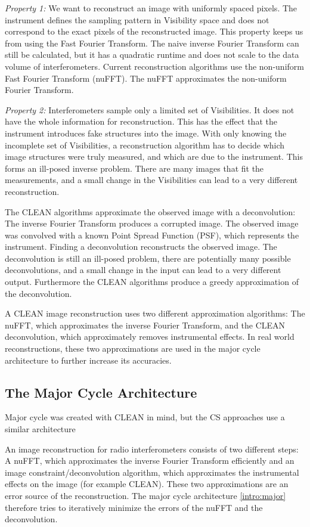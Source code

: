 \textit{Property 1:} We want to reconstruct an image with uniformly spaced pixels. The instrument defines the sampling pattern in Visibility space and does not correspond to the exact pixels of the reconstructed image. This property keeps us from using the Fast Fourier Transform. The naive inverse Fourier Transform can still be calculated, but it has a quadratic runtime and does not scale to the data volume of interferometers. Current reconstruction algorithms use the non-uniform Fast Fourier Transform (nuFFT). The nuFFT approximates the non-uniform Fourier Transform. 

\textit{Property 2:} Interferometers sample only a limited set of Visibilities. It does not have the whole information for reconstruction. This has the effect that the instrument introduces fake structures into the image. With only knowing the incomplete set of Visibilities, a reconstruction algorithm has to decide which image structures were truly measured, and which are due to the instrument. This forms an ill-posed inverse problem. There are many images that fit the measurements, and a small change in the Visibilities can lead to a very different reconstruction. 

The CLEAN algorithms approximate the observed image with a deconvolution: The inverse Fourier Transform produces a corrupted image. The observed image was convolved with a known Point Spread Function (PSF), which represents the instrument. Finding a deconvolution reconstructs the observed image. The deconvolution is still an ill-posed problem, there are potentially many possible deconvolutions, and a small change in the input can lead to a very different output. Furthermore the CLEAN algorithms produce a greedy approximation of the deconvolution. 

A CLEAN image reconstruction uses two different approximation algorithms: The nuFFT, which approximates the inverse Fourier Transform, and the CLEAN deconvolution, which approximately removes instrumental effects. In real world reconstructions, these two approximations are used in the major cycle architecture to further increase its accuracies.

\subsection{The Major Cycle Architecture}
Major cycle was created with CLEAN in mind, but the CS approaches use a similar architecture

An image reconstruction for radio interferometers consists of two different steps: A nuFFT, which approximates the inverse Fourier Transform efficiently and an image constraint/deconvolution algorithm, which approximates the instrumental effects on the image (for example CLEAN). These two approximations are an error source of the reconstruction. The major cycle architecture \ref{intro:major} therefore tries to iteratively minimize the errors of the nuFFT and the deconvolution.

